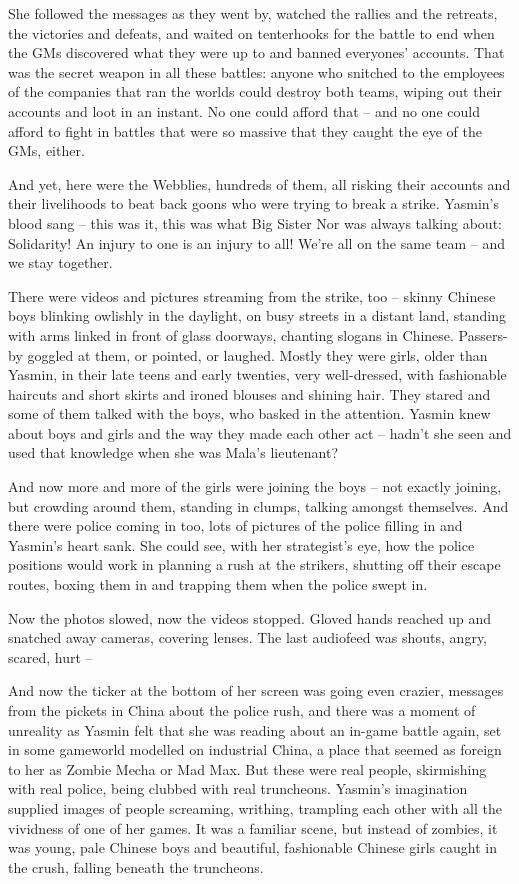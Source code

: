She followed the messages as they went by, watched the rallies and
the retreats, the victories and defeats, and waited on tenterhooks
for the battle to end when the GMs discovered what they were up to
and banned everyones' accounts. That was the secret weapon in all
these battles: anyone who snitched to the employees of the
companies that ran the worlds could destroy both teams, wiping out
their accounts and loot in an instant. No one could afford that --
and no one could afford to fight in battles that were so massive
that they caught the eye of the GMs, either.

And yet, here were the Webblies, hundreds of them, all risking
their accounts and their livelihoods to beat back goons who were
trying to break a strike. Yasmin's blood sang -- this was it, this
was what Big Sister Nor was always talking about: Solidarity! An
injury to one is an injury to all! We're all on the same team --
and we stay together.

There were videos and pictures streaming from the strike, too --
skinny Chinese boys blinking owlishly in the daylight, on busy
streets in a distant land, standing with arms linked in front of
glass doorways, chanting slogans in Chinese. Passers-by goggled at
them, or pointed, or laughed. Mostly they were girls, older than
Yasmin, in their late teens and early twenties, very well-dressed,
with fashionable haircuts and short skirts and ironed blouses and
shining hair. They stared and some of them talked with the boys,
who basked in the attention. Yasmin knew about boys and girls and
the way they made each other act -- hadn't she seen and used that
knowledge when she was Mala's lieutenant?

And now more and more of the girls were joining the boys -- not
exactly joining, but crowding around them, standing in clumps,
talking amongst themselves. And there were police coming in too,
lots of pictures of the police filling in and Yasmin's heart sank.
She could see, with her strategist's eye, how the police positions
would work in planning a rush at the strikers, shutting off their
escape routes, boxing them in and trapping them when the police
swept in.

Now the photos slowed, now the videos stopped. Gloved hands reached
up and snatched away cameras, covering lenses. The last audiofeed
was shouts, angry, scared, hurt --

And now the ticker at the bottom of her screen was going even
crazier, messages from the pickets in China about the police rush,
and there was a moment of unreality as Yasmin felt that she was
reading about an in-game battle again, set in some gameworld
modelled on industrial China, a place that seemed as foreign to her
as Zombie Mecha or Mad Max. But these were real people, skirmishing
with real police, being clubbed with real truncheons. Yasmin's
imagination supplied images of people screaming, writhing,
trampling each other with all the vividness of one of her games. It
was a familiar scene, but instead of zombies, it was young, pale
Chinese boys and beautiful, fashionable Chinese girls caught in the
crush, falling beneath the truncheons.

